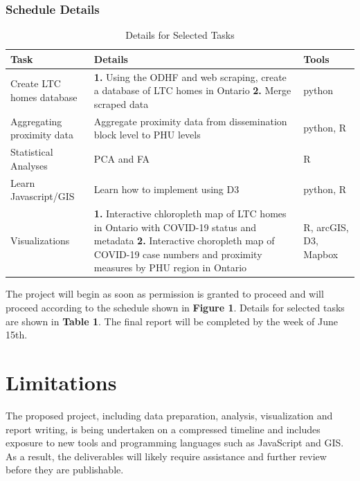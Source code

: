 \documentclass{article}
\begin{document}
\subsubsection{Schedule Details}
\begin{table}[h!]
	\begin{center}
   	 \caption{Details for Selected Tasks}
   	 \label{tab:table1}
		\begin{tabular}{p{35mm}|p{75mm}|p{20mm}}
			\textbf{Task} & \textbf{Details} & \textbf{Tools}\\
 			\hline\hline
 			Create LTC homes database & \textbf{1.} Using the ODHF and web scraping, create a database of LTC homes in Ontario \newline \textbf{2.} Merge scraped data & python \\
 			\hline
 			Aggregating proximity data & Aggregate proximity data from dissemination block level to PHU levels & python, R\\
 			\hline
			Statistical Analyses & PCA and FA & R\\
			\hline
			Learn Javascript/GIS & Learn how to implement using D3 & python, R\\
			\hline
			Visualizations & \textbf{1.} Interactive chloropleth map of LTC homes in Ontario with COVID-19 status and metadata \newline \textbf{2.} Interactive choropleth map of COVID-19 case numbers and proximity measures by PHU region in Ontario & R, arcGIS, D3, Mapbox\\

		\end{tabular}

	\end{center}
\end{table}



The project will begin as soon as permission is granted to proceed and will proceed according to the schedule shown in \textbf{Figure 1}. Details for selected tasks are shown in \textbf{Table 1}. The final report will be completed by the week of June 15th.


\section{Limitations}

The proposed project, including data preparation, analysis, visualization and report writing, is being undertaken on a compressed timeline and includes exposure to new tools and programming languages such as JavaScript and GIS. As a result, the deliverables will likely require assistance and further review before they are publishable.
 
\end{document}
